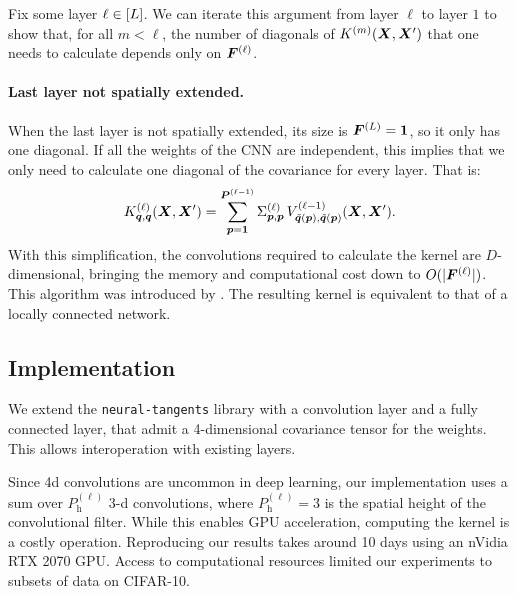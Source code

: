 \documentclass[accepted]{uai2021} %
\newcommand{\layersizebase}{\vF}
\newcommand{\layersize}[1]{{\layersizebase^{\bra{#1}}}}
\newcommand{\patchsizebase}{\vP}
\newcommand{\patchsize}[1]{{\patchsizebase^{\bra{#1}}}}
\newcommand{\patchh}[1]{P_\text{h}^{(#1)}}
\newcommand{\patchf}[2]{{\tilde#1\bra{#2}}}
\newcommand{\priorWcovs}[1]{\Sigma^{(#1)}}
\newcommand{\patch}{\vp}               %
\newcommand{\nextpatch}{\vq}
\newcommand{\covf}[1]{K\ssup{#1}}
\newcommand{\nlinf}[1]{V\ssup{#1}}
\newcommand{\0}{\boldsymbol{0}}
\newcommand{\1}{\boldsymbol{1}}
\begin{document}
Fix some layer $\ell\in[L]$.
We can iterate this argument from layer $\ell$ to layer $1$ to show that, for all $m < \ell$, the number of diagonals of $\covf{m}\bra{\mX,\mX'}$ that one needs to calculate depends only on $\layersize{\ell}$.

\paragraph{Last layer not spatially extended.} When the last layer is not spatially extended, its size is $\layersize{L}=\1$, so it only has one diagonal. If all the weights of the CNN are independent, this implies that we only need to calculate one diagonal of the covariance for every layer. That is:
\begin{equation}
\covf{\ell}_{\nextpatch,\nextpatch}\bra{\mX, \mX'} =
\sum_{\patch=\1}^{\patchsize{\ell-1}}
\priorWcovs{\ell}_{\patch,\patch} \,
\nlinf{\ell-1}_{\patchf{\nextpatch}{\patch},\patchf{\nextpatch}{\patch}}\bra{\mX, \mX'}.
\label{eq:cnn-kernel-independent-diagonal}
\end{equation}
With this simplification, the convolutions required to calculate the kernel are
$D$-dimensional, bringing the memory and computational cost down to $O(\absshort{\layersize{\ell}})$. This algorithm was introduced by \citet{garriga2018infiniteconv}. The resulting kernel is equivalent to that of a locally connected network.

\subsection{Implementation}
We extend the \texttt{neural-tangents} \citep{neuraltangents2020} library with a convolution layer and a fully connected layer, that admit a 4-dimensional covariance tensor for the weights. This allows interoperation with existing layers.

Since 4d convolutions are uncommon in deep learning, our implementation uses a sum over $\patchh{\ell}$ 3-d convolutions, where $\patchh{\ell}=3$ is the spatial height of the convolutional filter. While this enables GPU acceleration, computing the kernel is a costly operation. Reproducing our results takes around 10 days using an nVidia RTX 2070 GPU. Access to computational resources limited our experiments to subsets of data on CIFAR-10.
\end{document}
